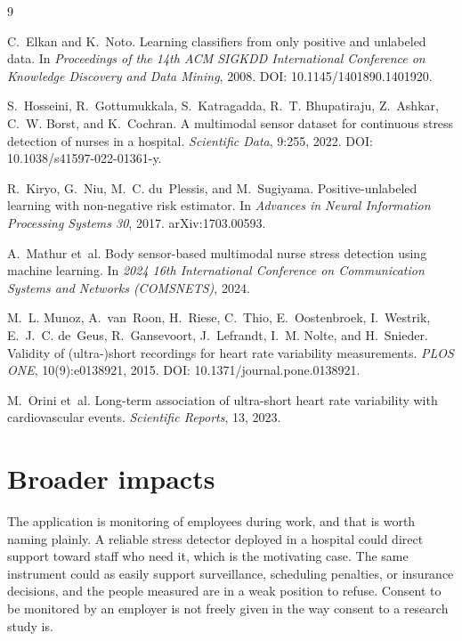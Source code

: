 \documentclass{article}
\begin{document}
\begin{thebibliography}{9}

C.~Elkan and K.~Noto.
\newblock Learning classifiers from only positive and unlabeled data.
\newblock In \emph{Proceedings of the 14th ACM SIGKDD International Conference
  on Knowledge Discovery and Data Mining}, 2008.
\newblock DOI: 10.1145/1401890.1401920.

S.~Hosseini, R.~Gottumukkala, S.~Katragadda, R.~T. Bhupatiraju, Z.~Ashkar,
  C.~W. Borst, and K.~Cochran.
\newblock A multimodal sensor dataset for continuous stress detection of nurses
  in a hospital.
\newblock \emph{Scientific Data}, 9:255, 2022.
\newblock DOI: 10.1038/s41597-022-01361-y.

R.~Kiryo, G.~Niu, M.~C. du~Plessis, and M.~Sugiyama.
\newblock Positive-unlabeled learning with non-negative risk estimator.
\newblock In \emph{Advances in Neural Information Processing Systems 30}, 2017.
\newblock arXiv:1703.00593.

A.~Mathur et~al.
\newblock Body sensor-based multimodal nurse stress detection using machine
  learning.
\newblock In \emph{2024 16th International Conference on Communication Systems
  and Networks (COMSNETS)}, 2024.

M.~L. Munoz, A.~van~Roon, H.~Riese, C.~Thio, E.~Oostenbroek, I.~Westrik,
  E.~J.~C. de~Geus, R.~Gansevoort, J.~Lefrandt, I.~M. Nolte, and H.~Snieder.
\newblock Validity of (ultra-)short recordings for heart rate variability
  measurements.
\newblock \emph{PLOS ONE}, 10(9):e0138921, 2015.
\newblock DOI: 10.1371/journal.pone.0138921.

M.~Orini et~al.
\newblock Long-term association of ultra-short heart rate variability with
  cardiovascular events.
\newblock \emph{Scientific Reports}, 13, 2023.

\end{thebibliography}


\newpage

\appendix

\section{Broader impacts}

The application is monitoring of employees during work, and that is worth
naming plainly. A reliable stress detector deployed in a hospital could direct
support toward staff who need it, which is the motivating case. The same
instrument could as easily support surveillance, scheduling penalties, or
insurance decisions, and the people measured are in a weak position to refuse.
Consent to be monitored by an employer is not freely given in the way consent
to a research study is.
\end{document}
